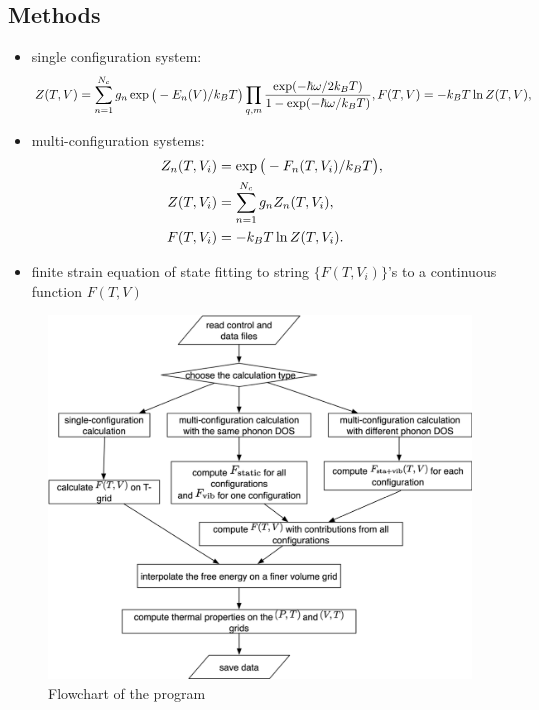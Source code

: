 \documentclass[13pt,aspectratio=169]{beamer}
\begin{document}
\subsection{Methods}
\begin{frame}[allowframebreaks]{\subsecname}
	\begin{itemize}
		\item single configuration system: \begin{equation}\footnotesize
		Z(T, V) = \sum_{n=1}^{N_c} g_n \exp\big( -{E_n(V)}/{k_B T} \big) \prod_{q, m} \frac{\exp(-\hbar \omega/2k_B T)}{1 - \exp(-\hbar \omega/k_B T)}, F(T, V) = -k_B T \ln Z(T, V),
		\end{equation}
		\item multi-configuration systems: \begin{align}\footnotesize
			      Z_n (T, V_i) & = \exp \big( -{ F_n (T, V_i) }/{ k_B T } \big), \\
			      Z(T, V_i)    & = \sum_{n=1}^{N_c} g_n Z_n (T, V_i),                \\
			      F(T, V_i)    & = -k_B T \ln Z(T, V_i).
		      \end{align}
		\item finite strain equation of state fitting to string $\{F(T, V_i)\}$’s to a continuous function $F(T, V)$
	\end{itemize}

	\begin{figure}
		\includegraphics[height=0.8\textheight]{images/flow}%
		\caption{Flowchart of the program}
	\end{figure}
\end{frame}
\end{document}
